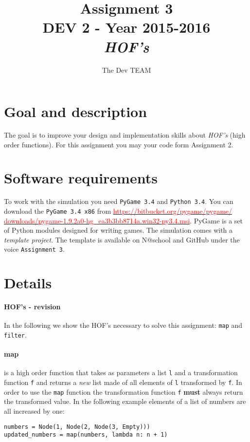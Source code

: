 \documentclass[10pt,a4paper]{article}
\begin{document}
\title{Assignment 3\\DEV 2 - Year 2015-2016\\\textit{HOF's}}
\author{The Dev TEAM}
\maketitle


\section{Goal and description}
The goal is to improve your design and implementation skills about \textit{HOF's} (high order functions). For this assignment you may your code form Assignment 2.

	
\section{Software requirements}
To work with the simulation you need \texttt{PyGame 3.4} and \texttt{Python 3.4}. You can download the \texttt{PyGame 3.4 x86} from \href{https://bitbucket.org/pygame/pygame/downloads/pygame-1.9.2a0-hg_ea3b3bb8714a.win32-py3.4.msi}{\textcolor{red}{https://bitbucket.org/pygame/pygame/ downloads/pygame-1.9.2a0-hg\_ea3b3bb8714a.win32-py3.4.msi}}. PyGame is a set of Python modules designed for writing games.	The simulation comes with a \textit{template project}. The template is available on N@school and GitHub under the voice \texttt{Assignment 3}.

\section{Details}
\paragraph{HOF's - revision}
In the following we show the HOF's necessary to solve this assignment: \texttt{map} and \texttt{filter}. 

\paragraph{map} is a high order function that takes as parameters a list \texttt{l} and a transformation function \texttt{f} and returns a \textit{new} list made of all elements of \texttt{l} transformed by \texttt{f}. In order to use the \texttt{map} function the transformation function \texttt{f} \textbf{must} always return the transformed value. In the following example elements of a list of numbers are all increased by one:
\begin{lstlisting}[frame=single,basicstyle=\ttfamily]
numbers = Node(1, Node(2, Node(3, Empty)))
updated_numbers = map(numbers, lambda n: n + 1)
\end{lstlisting}
\end{document}
